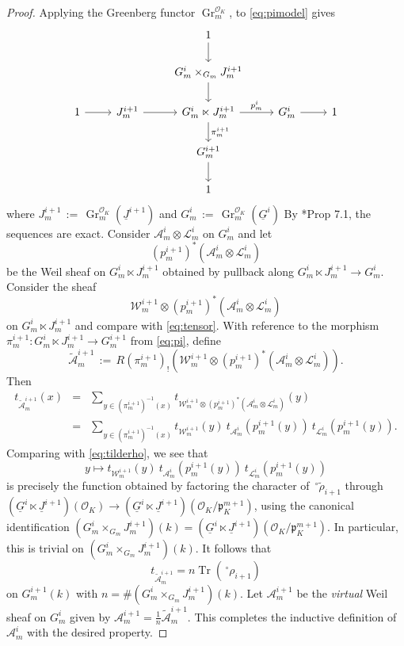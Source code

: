 \documentclass[10pt]{amsart}
\theoremstyle{plain}
\theoremstyle{definition}
\newcommand{\OK}{\mathcal{O}_K}
\newcommand{\Fq}{k}
\DeclareMathOperator{\Gr}{Gr}
\DeclareMathOperator{\trace}{Tr}
\newcommand{\ceq}{{\, :=\, }}
\newcommand{\trFrob}[1]{t_{#1}}
\newcommand{\cs}[1]{{\mathcal{#1}}}
\begin{document}
\begin{proof}
Applying the Greenberg functor $\Gr^{\OK}_m$, to \eqref{eq:pimodel} gives
\begin{equation}\label{eq:pi}
\begin{tikzcd}
\ && 1 \arrow{d} && \\
\ && G_m^{i}\times_{G_m} J_m^{i+1} \arrow{d} && \\
1 \arrow{r} &J_m^{i+1} \arrow{r} & G_m^i \ltimes J_m^{i+1} \arrow{d}{\pi_m^{i+1}} \arrow{r}{p_m^{i}} & G_m^i \arrow{r} & 1\\
&& G_m^{i+1} \arrow{d} && \\
&& 1 && 
\end{tikzcd}
\end{equation}
where $J_m^{i+1} \ceq \Gr^{\OK}_m(\underline{J}^{i+1})$ and $G_m^{i} \ceq \Gr^{\OK}_m(\underline{G}^{i})$
By \cite{BG-A}*{Prop 7.1}, the sequences are exact.
Consider $\cs{A}_m^{i}\otimes \cs{L}_m^{i}$ on $G_m^{i}$ and let 
\[
(p_m^{i+1})^*(\cs{A}_m^{i}\otimes \cs{L}_m^{i})
\]
be the Weil sheaf on $G_m^{i}\ltimes J_m^{i+1}$ obtained by pullback along $G_m^{i}\ltimes J_m^{i+1} \to G_m^{i}$.
Consider the sheaf 
\[
\cs{W}_m^{i+1} \otimes (p_m^{i+1})^*(\cs{A}_m^{i}\otimes \cs{L}_m^{i})
\]
on $G_m^{i}\ltimes J_m^{i+1}$ and compare with \eqref{eq:tensor}.
With reference to the morphism $\pi_m^{i+1} : G_m^i \ltimes J_m^{i+1} \to G_m^{i+1}$ from \eqref{eq:pi}, define
\[
\cs{\tilde A}_m^{i+1} \ceq R(\pi_m^{i+1})_! (\cs{W}_m^{i+1} \otimes (p_m^{i+1})^*(\cs{A}_m^{i}\otimes \cs{L}_m^{i})).
\]
Then
\begin{eqnarray*}
\trFrob{\cs{\tilde A}^{i+1}_m}(x)
&=& \sum_{y\in (\pi_m^{i+1})^{-1}(x)}  \trFrob{\cs{W}_m^{i+1} \otimes (p_m^{i+1})^*(\cs{A}_m^{i}\otimes \cs{L}_m^i)}(y)\\
&=& \sum_{y\in (\pi_m^{i+1})^{-1}(x)}  \trFrob{\cs{W}_m^{i+1}}(y)\  \trFrob{\cs{A}_m^{i}}(p_m^{i+1}(y) )\ \trFrob{\cs{L}_m^i}(p_m^{i+1}(y)).
\end{eqnarray*}
Comparing with \eqref{eq:tilderho}, we see that 
\[
y \mapsto \trFrob{\cs{W}_m^{i+1}}(y)\ \trFrob{\cs{A}_m^{i}}(p_m^{i+1}(y))\ \trFrob{\cs{L}_m^i}(p_m^{i+1}(y))
\]
is precisely the function obtained by factoring the character of $\,^\circ {\tilde \rho}_{i+1}$ through $(\underline{G}^{i}\ltimes \underline{J}^{i+1})(\OK) \to (\underline{G}^{i}\ltimes \underline{J}^{i+1})(\OK/\mathfrak{p}_K^{m+1})$, using the canonical identification $(G_m^{i}\times_{G_m} J_m^{i+1})(\Fq) =  (\underline{G}^{i}\ltimes \underline{J}^{i+1})(\OK/\mathfrak{p}_K^{m+1})$. 
In particular, this is trivial on $(G_m^{i}\times_{G_m} J_m^{i+1})(\Fq)$.
It follows that 
\[
\trFrob{\cs{\tilde A}^{i+1}_m} = n \trace(\,^\circ \rho_{i+1})
\]
on $G_m^{i+1}(\Fq)$ with $n = \# (G_m^{i}\times_{G_m} J_m^{i+1})(\Fq)$.
Let $\cs{A}_m^{i+1}$ be the \emph{virtual} Weil sheaf on $G_m^i$ given by $\cs{A}_m^{i+1} = \frac{1}{n} \cs{\tilde A}_m^{i+1}$.
%
This completes the inductive definition of $\cs{A}_m^i$ with the desired property.


\end{proof}
\end{document}
